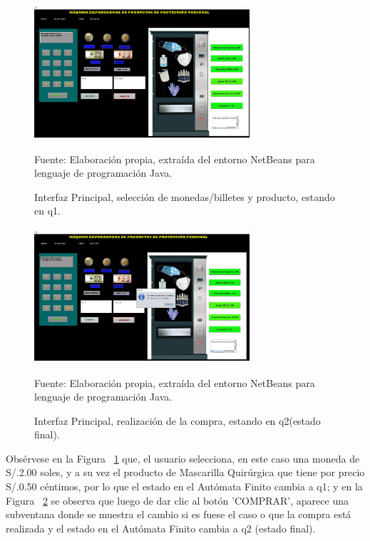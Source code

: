 \documentclass[10pt,conference]{IEEEtran}
\begin{document}
\begin{figure}[H]
    \begin{center}
    \includegraphics[width=8cm, height=5cm]{Resultados/5-Interfaz.JPG}
    \centering
    \caption{Interfaz Principal, selección de monedas/billetes y producto, estando en q1.}
    \label{5-Interfaz} 
    \vspace{1.5 mm}
    {\small Fuente: Elaboración propia, extraída del entorno NetBeans para lenguaje de programación Java.}
    \end{center}
\end{figure}
\begin{figure}[H]
    \begin{center}
    \includegraphics[width=8cm, height=5cm]{Resultados/6-Interfaz.JPG}
    \centering
    \caption{Interfaz Principal, realización de la compra, estando en q2(estado final).}
    \label{6-Interfaz} 
    \vspace{1.5 mm}
    {\small Fuente: Elaboración propia, extraída del entorno NetBeans para lenguaje de programación Java.}
    \end{center}
\end{figure}

Obsérvese en la Figura ~\ref{5-Interfaz} que, el usuario selecciona, en este caso una moneda de S/.2.00 soles, y a su vez el producto de Mascarilla Quirúrgica que tiene por precio S/.0.50 céntimos, por lo que el estado en el Autómata Finito cambia a q1; y en la Figura ~\ref{6-Interfaz} se observa que luego de dar clic al botón 'COMPRAR', aparece una subventana donde se muestra el cambio si es fuese el caso o que la compra está realizada y el estado en el Autómata Finito cambia a q2 (estado final).
\end{document}
